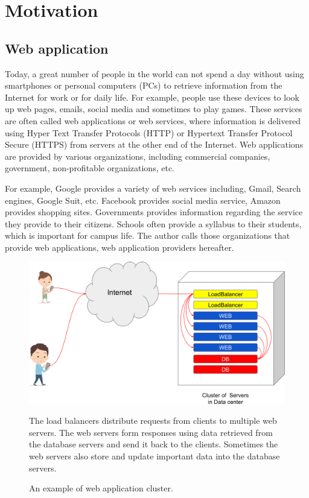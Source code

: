 
\section{Motivation}

\subsection{Web application}

Today, a great number of  people in the world can not spend a day without using smartphones or personal computers (PCs) to retrieve information from the Internet for work or for daily life.
For example, people use these devices to look up web pages, emails, social media and sometimes to play games.
These services are often called web applications or web services, where information is delivered using Hyper Text Transfer Protocols (HTTP) or Hypertext Transfer Protocol Secure (HTTPS) from servers at the other end of the Internet.
Web applications are provided by various organizations, including commercial companies, government, non-profitable organizations, etc.

For example, Google provides a variety of web services including, Gmail, Search engines, Google Suit, etc.
Facebook provides social media service, Amazon provides shopping sites.
Governments provides information regarding the service they provide to their citizens.
Schools often provide a syllabus to their students, which is important for campus life.
The author calls those organizations that provide web applications, web application providers hereafter.

\begin{figure}[h]
\begin{center}
\includegraphics[width=0.8\columnwidth]{Figs/web_cluster.png}
\end{center}
\caption{
An example of web application cluster.
}
\centering\parbox[c]{0.9\columnwidth}{
The load balancers distribute requests from clients to multiple web servers.
The web servers form responses using data retrieved from the database servers and send it back to the clients.
Sometimes the web servers also store and update important data into the database servers.
}
\label{fig:web_cluster}
\end{figure}

